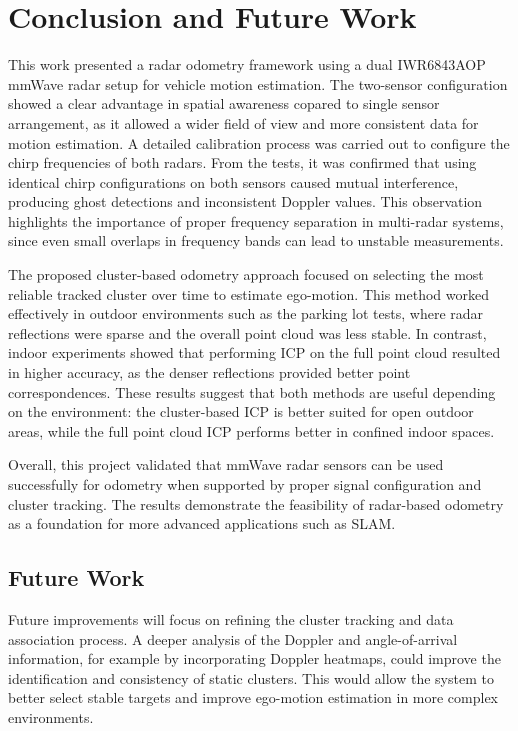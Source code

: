 \newpage
\section{Conclusion and Future Work}

This work presented a radar odometry framework using a dual IWR6843AOP mmWave radar setup for vehicle motion estimation.  
The two-sensor configuration showed a clear advantage in spatial awareness copared to single sensor arrangement, as it allowed a wider field of view and more consistent data for motion estimation.  
A detailed calibration process was carried out to configure the chirp frequencies of both radars.  
From the tests, it was confirmed that using identical chirp configurations on both sensors caused mutual interference, producing ghost detections and inconsistent Doppler values.  
This observation highlights the importance of proper frequency separation in multi-radar systems, since even small overlaps in frequency bands can lead to unstable measurements.

The proposed cluster-based odometry approach focused on selecting the most reliable tracked cluster over time to estimate ego-motion.  
This method worked effectively in outdoor environments such as the parking lot tests, where radar reflections were sparse and the overall point cloud was less stable.  
In contrast, indoor experiments showed that performing ICP on the full point cloud resulted in higher accuracy, as the denser reflections provided better point correspondences.  
These results suggest that both methods are useful depending on the environment: the cluster-based ICP is better suited for open outdoor areas, while the full point cloud ICP performs better in confined indoor spaces.

Overall, this project validated that mmWave radar sensors can be used successfully for odometry when supported by proper signal configuration and cluster tracking.  
The results demonstrate the feasibility of radar-based odometry as a foundation for more advanced applications such as SLAM.

\subsection{Future Work}

Future improvements will focus on refining the cluster tracking and data association process.  
A deeper analysis of the Doppler and angle-of-arrival information, for example by incorporating Doppler heatmaps, could improve the identification and consistency of static clusters.  
This would allow the system to better select stable targets and improve ego-motion estimation in more complex environments.

